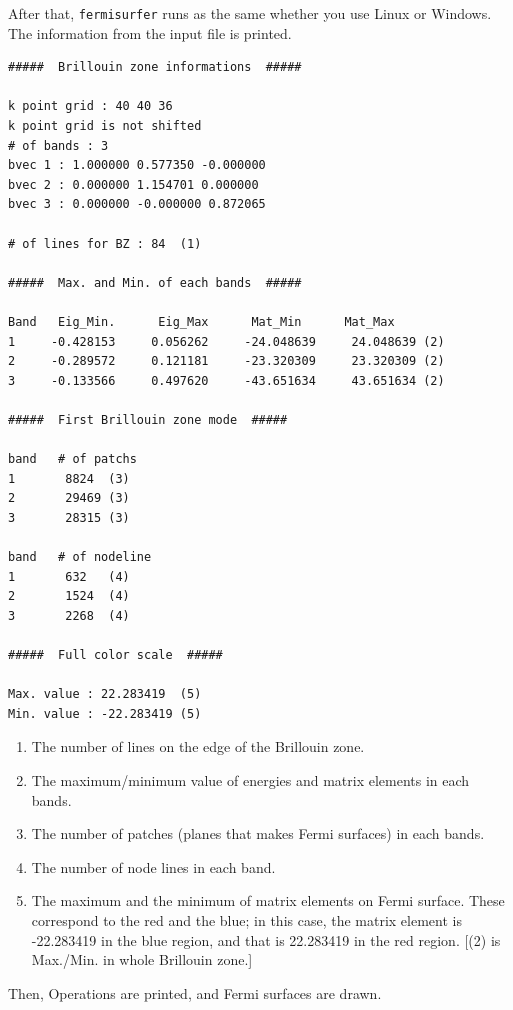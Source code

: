 \documentclass[12pt]{article}
\begin{document}
\vspace{0.5cm}
After that, \verb|fermisurfer| runs as the same whether you use Linux or Windows.
The information from the input file is printed.

\begin{verbatim}
#####  Brillouin zone informations  ##### 

k point grid : 40 40 36 
k point grid is not shifted 
# of bands : 3 
bvec 1 : 1.000000 0.577350 -0.000000 
bvec 2 : 0.000000 1.154701 0.000000 
bvec 3 : 0.000000 -0.000000 0.872065 

# of lines for BZ : 84  (1)

#####  Max. and Min. of each bands  ##### 
     
Band   Eig_Min.      Eig_Max      Mat_Min      Mat_Max 
1     -0.428153     0.056262     -24.048639     24.048639 (2)
2     -0.289572     0.121181     -23.320309     23.320309 (2)
3     -0.133566     0.497620     -43.651634     43.651634 (2)

#####  First Brillouin zone mode  #####

band   # of patchs
1       8824  (3)
2       29469 (3)
3       28315 (3)

band   # of nodeline 
1       632   (4)
2       1524  (4)
3       2268  (4)

#####  Full color scale  ##### 

Max. value : 22.283419  (5)
Min. value : -22.283419 (5) 

\end{verbatim}

\begin{enumerate}
  \renewcommand{\labelenumi}{(\arabic{enumi})}
  \item The number of lines on the edge of the Brillouin zone.
  \item The maximum/minimum value of energies and matrix elements in each bands.
  \item The number of patches (planes that makes Fermi surfaces) in each bands.
  \item The number of node lines in each band.
  \item The maximum and the minimum of matrix elements on 
    Fermi surface.
    These correspond to the red and the blue;
    in this case, the matrix element is -22.283419 in the blue region,
    and that is 22.283419 in the red region.
    [(2) is Max./Min. in whole Brillouin zone.]    
\end{enumerate}

Then, Operations are printed, and
Fermi surfaces are drawn.
\end{document}

